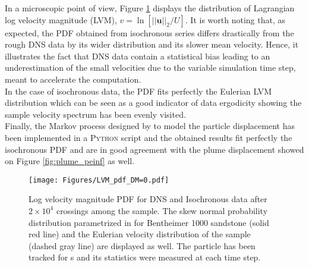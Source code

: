 In a microscopic point of view, Figure \ref{fig:lvm_pdf_peinf} displays the distribution of Lagrangian log velocity magnitude (LVM), $v = \ln[||\textbf{u}||_2/U]$. 
It is worth noting that, as expected, the PDF obtained from isochronous series differs drastically from the rough DNS data by its wider distribution and its slower mean velocity.
Hence, it illustrates the fact that DNS data contain a statistical bias leading to an underestimation of the small velocities due to the variable simulation time step, meant to accelerate the computation.\\
In the case of isochronous data, the PDF fits perfectly the Eulerian LVM distribution which can be seen as a good indicator of data ergodicity showing the sample velocity spectrum has been evenly visited.\\
Finally, the Markov process designed by \cite{Meyer2016} to model the particle displacement has been implemented in a \textsc{Python} script and the obtained results fit perfectly the isochronous PDF and are in good agreement with the plume displacement showed on Figure \ref{fig:plume_peinf} as well.

\begin{figure}[h!]
	\centering
	\texttt{[image: Figures/LVM\_pdf\_DM=0.pdf]}
	\caption{Log velocity magnitude PDF for DNS and Isochronous data after $2\times 10^4$ crossings among the sample. The skew normal probability distribution parametrized in \citet{Meyer2016} for Bentheimer 1000 sandstone (solid red line) and the Eulerian velocity distribution of the sample (dashed gray line) are displayed as well. The particle has been tracked for s and its statistics were measured at each time step.}
	\label{fig:lvm_pdf_peinf}
\end{figure}

